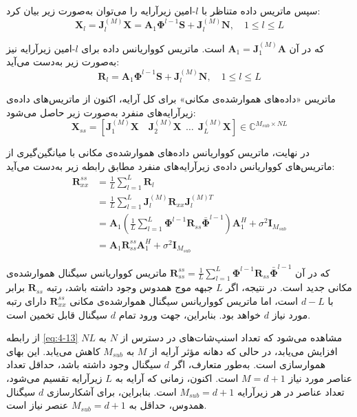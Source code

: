 سپس ماتریس داده متناظر با $l$-امین زیرآرایه را می‌توان به‌صورت زیر بیان کرد:
\begin{equation}
	\bm{X}_l = \bm{J}_l^{(M)} \bm{X} = \bm{A}_1 \bm{\Phi}^{l-1} \bm{S} + \bm{J}_l^{(M)} \bm{N}, \quad 1 \leq l \leq L
	\label{eq:4-11}
\end{equation}

که در آن $\bm{A}_1 = \bm{J}_1^{(M)} \bm{A}$ است. ماتریس کوواریانس داده برای $l$-امین زیرآرایه نیز به‌صورت زیر به‌دست می‌آید:
\begin{equation}
	\bm{R}_l = \bm{A}_1 \bm{\Phi}^{l-1} \bm{S} + \bm{J}_l^{(M)} \bm{N}, \quad 1 \leq l \leq L
	\label{eq:4-12}
\end{equation}

ماتریس «داده‌های هموارشده‌ی مکانی» برای کل آرایه، اکنون از ماتریس‌های داده‌ی زیرآرایه‌های منفرد به‌صورت زیر حاصل می‌شود:
\begin{equation}
	\bm{X}_{ss} =
	 [
\bm{J}_1^{(M)}\bm{X} \quad \bm{J}_2^{(M)}\bm{X} \ \
\ldots\ \ \bm{J}_L^{(M)}\bm{X}
] \in \mathbb{C}^{M_{sub} \times NL}
	\label{eq:4-13}
\end{equation}


در نهایت، ماتریس کوواریانس داده‌های هموارشده‌ی مکانی با میانگین‌گیری از ماتریس‌های کوواریانس داده‌ی زیرآرایه‌های منفرد مطابق رابطه زیر به‌دست می‌آید:
\begin{align}
	\bm{R}_{xx}^{ss} &= \frac{1}{L} \sum_{l=1}^{L} \bm{R}_l \nonumber \\
	&= \frac{1}{L} \sum_{l=1}^{L} \bm{J}_l^{(M)} \bm{R}_{xx} \bm{J}_l^{(M)T} \nonumber \\
	&= \bm{A}_1 \left( \frac{1}{L} \sum_{l=1}^{L} \bm{\Phi}^{l-1} \bm{R}_{ss} \bar{\bm{\Phi}}^{l-1} \right) \bm{A}_1^H + \sigma^2 \bm{I}_{M_{sub}} \nonumber \\
	&= \bm{A}_1 \bm{R}_{ss}^{ss} \bm{A}_1^H + \sigma^2 \bm{I}_{M_{sub}}
	\label{eq:4-14}
\end{align}


که در آن $\bm{R}_{ss}^{ss} = \frac{1}{L} \sum_{l=1}^{L} \bm{\Phi}^{l-1} \bm{R}_{ss} \bar{\bm{\Phi}}^{l-1}$ ماتریس کوواریانس سیگنال هموارشده‌ی مکانی جدید است. در نتیجه، اگر $L$ جبهه موج همدوس وجود داشته باشد، رتبه $\bm{R}_{ss}$ برابر با $d-L$ است، اما ماتریس کوواریانس سیگنال هموارشده‌ی مکانی $\bm{R}_{xx}^{ss}$ دارای رتبه مورد نیاز $d$ خواهد بود. بنابراین، جهت ورود تمام $d$ سیگنال قابل تخمین است.

از رابطه \eqref{eq:4-13} مشاهده می‌شود که تعداد اسنپ‌شات‌های در دسترس از $N$ به $NL$ افزایش می‌یابد، در حالی که دهانه مؤثر آرایه از $M$ به $M_{sub}$ کاهش می‌یابد. این بهای هموارسازی است. به‌طور متعارف، اگر $d$ سیگنال وجود داشته باشد، حداقل تعداد عناصر مورد نیاز $M = d + 1$ است. اکنون، زمانی که آرایه به $L$ زیرآرایه تقسیم می‌شود، تعداد عناصر در هر زیرآرایه $M_{sub} = d + 1$ است. بنابراین، برای آشکارسازی $d$ سیگنال همدوس، حداقل به $M_{sub} = d + 1$ عنصر نیاز است.

